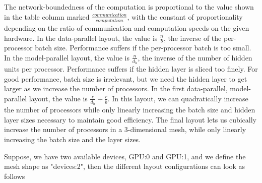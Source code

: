 \documentclass{article}
\begin{document}
The network-boundedness of the computation is proportional to the value shown in the table column marked $\frac{communication}{computation}$, with the constant of proportionality depending on the ratio of communication and computation speeds on the given hardware.   In the data-parallel layout, the value is $\frac{n}{b}$, the inverse of the per-processor batch size.  Performance suffers if the per-processor batch is too small.  In the model-parallel layout, the value is $\frac{n}{d_h}$, the inverse of the number of hidden units per processor.  Performance suffers if the hidden layer is sliced too finely.  For good performance, batch size is irrelevant, but we need the hidden layer to get larger as we increase the number of processors.  In the first data-parallel, model-parallel layout, the value is $\frac{c}{d_h} + \frac{r}{b}$.  In this layout, we can quadratically increase the number of processors while only linearly increasing the batch size and hidden layer sizes necessary to maintain good efficiency.  The final layout lets us cubically increase the number of processors in a 3-dimensional mesh, while only linearly increasing the batch size and the layer sizes.






\iffalse
Suppose, we have two available devices, GPU:0 and GPU:1, and we define the mesh shape as "devices:2", then the different layout configurations can look as follows
\end{document}
